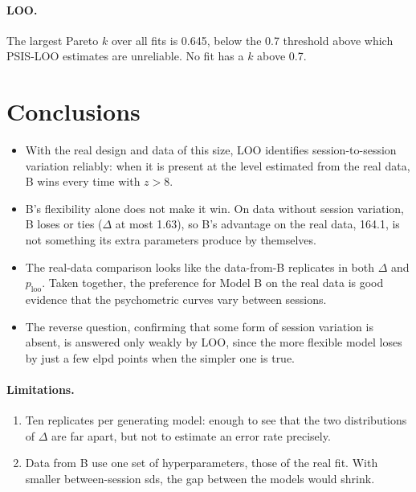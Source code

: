 \documentclass[11pt]{article}
\begin{document}
\paragraph{LOO.} The largest Pareto $k$ over all fits is 0.645, below the 0.7 threshold
above which PSIS-LOO estimates are unreliable. No fit has a $k$ above 0.7.

\section{Conclusions}

\begin{itemize}
  \item With the real design and data of this size, LOO identifies session-to-session
        variation reliably: when it is present at the level estimated from the real
        data, B wins every time with $z > 8$.
  \item B's flexibility alone does not make it win. On data without session variation,
        B loses or ties ($\Delta$ at most 1.63), so B's advantage on the real data,
        164.1, is not something its extra parameters produce by themselves.
  \item The real-data comparison looks like the data-from-B replicates in both $\Delta$
        and $p_\text{loo}$. Taken together, the preference for Model B on the real data
        is good evidence that the psychometric curves vary between sessions.
  \item The reverse question, confirming that some form of session variation is
        absent, is answered only weakly by LOO, since the more flexible model loses
        by just a few elpd points when the simpler one is true.
\end{itemize}

\paragraph{Limitations.}
\begin{enumerate}
  \item Ten replicates per generating model: enough to see that the two
        distributions of $\Delta$ are far apart, but not to estimate an error rate
        precisely.
  \item Data from B use one set of hyperparameters, those of the real fit. With
        smaller between-session sds, the gap between the models would shrink.
\end{enumerate}
\end{document}
